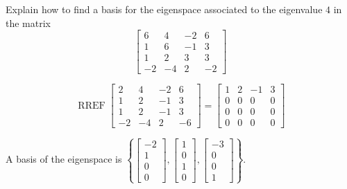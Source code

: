 
\begin{exerciseStatement}


Explain how to find a basis for the eigenspace associated to the eigenvalue \( 4 \) in the matrix \[ \left[\begin{array}{cccc}
6 & 4 & -2 & 6 \\
1 & 6 & -1 & 3 \\
1 & 2 & 3 & 3 \\
-2 & -4 & 2 & -2
\end{array}\right] \]


\end{exerciseStatement}
    
\begin{exerciseAnswer} 


\[\operatorname{RREF} \left[\begin{array}{cccc}
2 & 4 & -2 & 6 \\
1 & 2 & -1 & 3 \\
1 & 2 & -1 & 3 \\
-2 & -4 & 2 & -6
\end{array}\right] = \left[\begin{array}{cccc}
1 & 2 & -1 & 3 \\
0 & 0 & 0 & 0 \\
0 & 0 & 0 & 0 \\
0 & 0 & 0 & 0
\end{array}\right] \]



A basis of the eigenspace is \( \left\{ \left[\begin{array}{c}
-2 \\
1 \\
0 \\
0
\end{array}\right] , \left[\begin{array}{c}
1 \\
0 \\
1 \\
0
\end{array}\right] , \left[\begin{array}{c}
-3 \\
0 \\
0 \\
1
\end{array}\right] \right\} \).


\end{exerciseAnswer}
    
